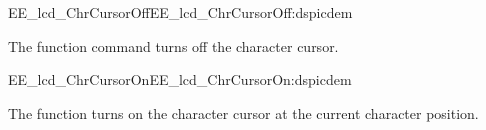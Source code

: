 \begin{function_nopb2}{EE\_lcd\_ChrCursorOff}{EE_lcd_ChrCursorOff:dspicdem}
  
  \begin{fundescription}
    The function command turns off the character cursor.
  \end{fundescription}
  
  
  
\end{function_nopb2}

\begin{function_nopb2}{EE\_lcd\_ChrCursorOn}{EE_lcd_ChrCursorOn:dspicdem}
  
  \begin{fundescription}
    The function turns on the character cursor at the current
    character position.
  \end{fundescription}
  
  
  
\end{function_nopb2}

